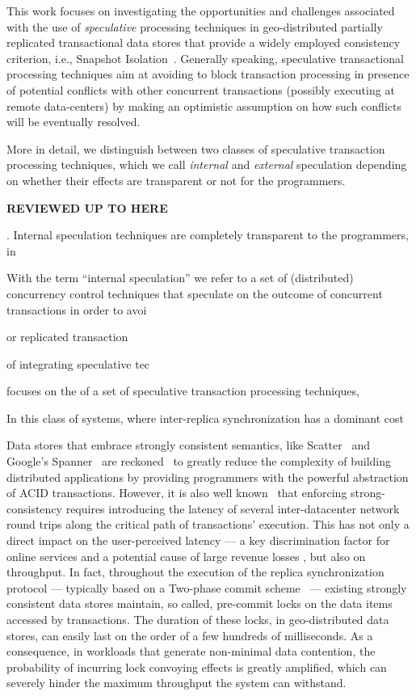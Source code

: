 This work focuses on investigating the opportunities and challenges associated with the use of \textit{speculative} processing techniques in geo-distributed partially replicated transactional data stores  that provide a widely employed consistency criterion, i.e., Snapshot Isolation~\cite{xxx}. Generally speaking, speculative transactional processing techniques aim at avoiding to block transaction processing in presence of potential conflicts with other concurrent transactions (possibly executing at remote data-centers) by making an optimistic assumption on how  such conflicts will be eventually resolved.

More in detail, we distinguish between two classes of speculative transaction processing techniques, which we call \textit{internal} and \textit{external} speculation depending on whether their effects are transparent or not for the programmers.

{\bf REVIEWED UP TO HERE}


. Internal speculation techniques are completely transparent to the programmers, in


With the term ``internal speculation'' we refer to a set of (distributed) concurrency control techniques that speculate on the outcome of concurrent transactions in order to avoi



or replicated transaction

 of integrating speculative tec

 focuses on the  of a set of speculative transaction processing techniques, 

In this class of systems, where inter-replica synchronization has a dominant cost





Data stores that embrace strongly consistent semantics, like Scatter~\cite{scatter} and Google's Spanner~\cite{spanner} are reckoned~\cite{shute2012f1} to greatly reduce the complexity of building distributed applications by providing programmers with the powerful abstraction of ACID transactions. However, it is also well known~\cite{brewer2012cap}  that enforcing strong-consistency requires introducing the latency of several inter-datacenter network round trips along the critical path of transactions' execution. This has not only a direct impact on the user-perceived latency --- a key discrimination factor for online services and a potential cause of large revenue losses  \cite{schurman2009user}, but also on throughput. In fact, throughout the execution of the replica synchronization protocol --- typically based on a Two-phase commit scheme~\cite{spanner,peluso2012score} --- existing strongly consistent data stores maintain, so called, pre-commit locks on the data items accessed by transactions. The duration of these locks, in geo-distributed data stores, can easily last on the order of a few hundreds of milliseconds. As a consequence, in workloads that generate non-minimal data contention, the probability of incurring lock convoying effects is greatly amplified, which can severely hinder the maximum throughput the system can withstand.


